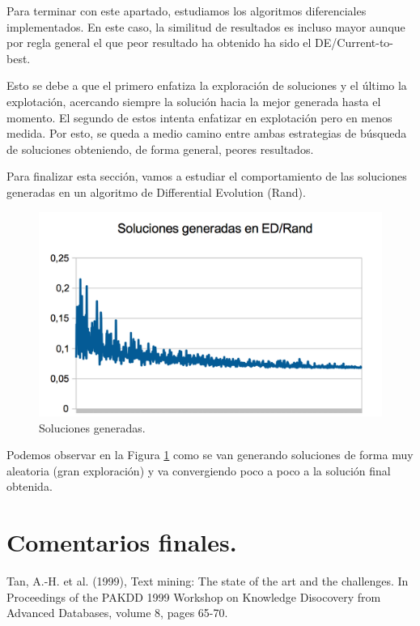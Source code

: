 \documentclass{article}
\begin{document}
	Para terminar con este apartado, estudiamos los algoritmos diferenciales implementados.  En este caso, la similitud de resultados es incluso mayor aunque por regla general el que peor resultado ha obtenido ha sido el DE/Current-to-best. 
	
	Esto se debe a que el primero enfatiza la exploración de soluciones y el último la explotación, acercando siempre la solución hacia la mejor generada hasta el momento. El segundo de estos intenta enfatizar en explotación pero en menos medida. Por esto, se queda a medio camino entre ambas estrategias de búsqueda de soluciones obteniendo, de forma general, peores resultados.
	
	Para finalizar esta sección, vamos a estudiar el comportamiento de las soluciones generadas en un algoritmo de Differential Evolution (Rand). 
	
	\begin{figure}[H]
		\centering
		\includegraphics[width=0.7\linewidth]{rand}
		\caption{Soluciones generadas.}
		\label{fig:rand}
	\end{figure}
	

	Podemos observar en la Figura \ref{fig:rand} como se van generando soluciones de forma muy aleatoria (gran exploración) y va convergiendo poco a poco a la solución final obtenida.
	
	

\section{Comentarios finales.}
	

\begin{thebibliography}{99}
 \hspace{-.22cm} Tan, A.-H. et al. (1999), Text mining: The state of the art and
	the challenges. In Proceedings of the PAKDD 1999 Workshop on Knowledge
	Disocovery from Advanced Databases, volume 8, pages 65-70.
\end{thebibliography}
\end{document}
